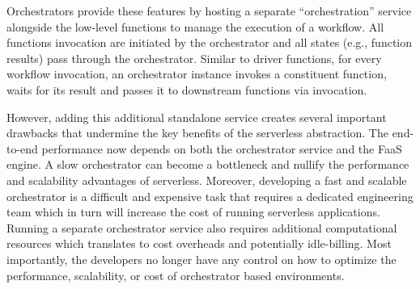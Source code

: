 Orchestrators provide these features by hosting a separate ``orchestration''
service alongside the low-level functions to manage the execution of a
workflow. All functions invocation are initiated by the orchestrator and all
states (e.g., function results) pass through the orchestrator. Similar to
driver functions, for every workflow invocation, an orchestrator instance
invokes a constituent function, waits for its result and passes it to
downstream functions via invocation.

However, adding this additional standalone service creates several important
drawbacks that undermine the key benefits of the serverless abstraction. The
end-to-end performance now depends on both the orchestrator service and the
FaaS engine. A slow orchestrator can become a bottleneck and nullify the
performance and scalability advantages of serverless. Moreover, developing a
fast and scalable orchestrator is a difficult and expensive task that
requires a dedicated engineering team which in turn will increase the cost of
running serverless applications. Running a separate orchestrator service also
requires additional computational resources which translates to cost overheads
and potentially idle-billing. Most importantly, the developers no longer have
any control on how to optimize the performance, scalability, or cost of
orchestrator based environments.   






